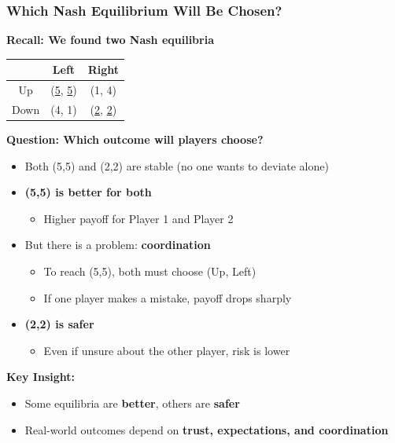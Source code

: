 \begin{frame}[fragile]\frametitle{Which Nash Equilibrium Will Be Chosen?}

\textbf{Recall: We found two Nash equilibria}

\begin{center}
\begin{tabular}{|c|c|c|}
  \hline
  & Left & Right \\
  \hline
  Up & (\underline{5}, \underline{5}) & (1, 4) \\
  \hline
  Down & (4, 1) & (\underline{2}, \underline{2}) \\
  \hline
\end{tabular}
\end{center}

\vspace{6pt}

\textbf{Question: Which outcome will players choose?}

\vspace{6pt}

\begin{itemize}
  \item Both (5,5) and (2,2) are stable (no one wants to deviate alone)
  
  \item \textbf{(5,5) is better for both}  
  \begin{itemize}
    \item Higher payoff for Player 1 and Player 2
  \end{itemize}
  
  \item But there is a problem: \textbf{coordination}
  \begin{itemize}
    \item To reach (5,5), both must choose (Up, Left)
    \item If one player makes a mistake, payoff drops sharply
  \end{itemize}
  
  \item \textbf{(2,2) is safer}
  \begin{itemize}
    \item Even if unsure about the other player, risk is lower
  \end{itemize}
\end{itemize}

\vspace{6pt}

\textbf{Key Insight:}
\begin{itemize}
  \item Some equilibria are \textbf{better}, others are \textbf{safer}
  \item Real-world outcomes depend on \textbf{trust, expectations, and coordination}
\end{itemize}

\end{frame}

